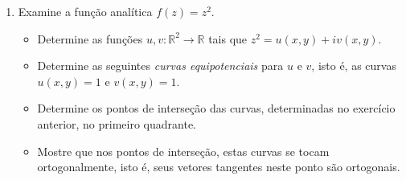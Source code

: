 \begin{enumerate}[leftmargin=*]
	


	\item Examine a função analítica $f(z) = z^2$.

		\begin{itemize}
			\item Determine as funções $u,v:\mathbb{R}^2\to\mathbb{R}$ tais que
			$z^2=u(x,y)+iv(x,y)$.
			
			\item 	Determine as seguintes {\it curvas equipotenciais} para $u$ e $v$, isto é,  
			      	as curvas $u(x,y)=1$ e $v(x,y)=1$.
			      
			 \item 	Determine os pontos de interseção das curvas, determinadas no exercício anterior, 
			 		no primeiro quadrante.
			 		
			 \item  Mostre que nos pontos de interseção, estas curvas se tocam ortogonalmente,
			 		isto é, seus vetores tangentes neste ponto são ortogonais.
		\end{itemize}


	
\end{enumerate}
